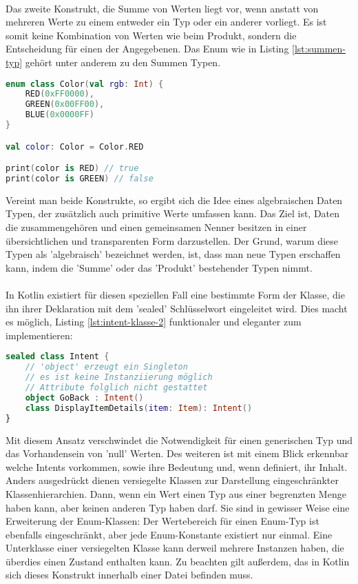 \\
Das zweite Konstrukt, die Summe von Werten liegt vor, wenn anstatt von mehreren Werte zu einem entweder ein Typ oder ein anderer vorliegt. Es ist somit keine Kombination von Werten wie beim Produkt, sondern die Entscheidung für einen der Angegebenen. Das Enum wie in Listing
\ref{lst:summen-typ}
gehört unter anderem zu den Summen Typen.
\begin{lstlisting}[caption={Summen Typ}, label={lst:summen-typ}, language=Kotlin]
enum class Color(val rgb: Int) {
	RED(0xFF0000),
	GREEN(0x00FF00),
	BLUE(0x0000FF)
}

val color: Color = Color.RED

print(color is RED) // true
print(color is GREEN) // false
\end{lstlisting}
\bigskip
Vereint man beide Konstrukte, so ergibt sich die Idee eines algebraischen Daten Typen, der zusätzlich 
auch primitive Werte umfassen kann. Das Ziel ist, Daten die zusammengehören und einen gemeinsamen Nenner 
besitzen in einer übersichtlichen und transparenten Form darzustellen. Der Grund, warum diese Typen als 
'algebraisch' bezeichnet werden, ist, dass man neue Typen erschaffen kann, indem die 'Summe' oder das 
'Produkt' bestehender Typen nimmt.
\\
\\
In Kotlin existiert für diesen speziellen Fall eine bestimmte Form der Klasse, die ihn ihrer Deklaration mit dem 'sealed' Schlüsselwort eingeleitet wird. Dies macht es möglich, Listing 
\ref{lst:intent-klasse-2}
funktionaler und eleganter zum implementieren:
\begin{lstlisting}[caption={Intents als sealded class}, label={lst:intents-sealed-class}, language=Kotlin]
sealed class Intent {
	// 'object' erzeugt ein Singleton
	// es ist keine Instanziierung möglich
	// Attribute folglich nicht gestattet
	object GoBack : Intent()
	class DisplayItemDetails(item: Item): Intent()
}
\end{lstlisting}
\bigskip
Mit diesem Ansatz verschwindet die Notwendigkeit für einen generischen Typ und das Vorhandensein von 
'null' Werten. Des weiteren ist mit einem Blick erkennbar welche Intents vorkommen, sowie ihre Bedeutung 
und, wenn definiert, ihr Inhalt. Anders ausgedrückt dienen versiegelte Klassen zur Darstellung 
eingeschränkter Klassenhierarchien. Dann, wenn ein Wert einen Typ aus einer begrenzten Menge haben kann, 
aber keinen anderen Typ haben darf. Sie sind in gewisser Weise eine Erweiterung der Enum-Klassen: Der 
Wertebereich für einen Enum-Typ ist ebenfalls eingeschränkt, aber jede Enum-Konstante existiert nur 
einmal. Eine Unterklasse einer versiegelten Klasse kann derweil mehrere Instanzen haben, die überdies 
einen Zustand enthalten kann.
Zu beachten gilt außerdem, das in Kotlin sich dieses Konstrukt innerhalb einer Datei befinden muss.
\\
